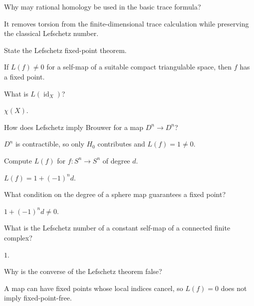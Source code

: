\begin{problem}
Why may rational homology be used in the basic trace formula?
\end{problem}
\begin{solution}
It removes torsion from the finite-dimensional trace calculation while preserving the classical Lefschetz number.
\end{solution}

\begin{problem}
State the Lefschetz fixed-point theorem.
\end{problem}
\begin{solution}
If $L(f)\ne0$ for a self-map of a suitable compact triangulable space, then $f$ has a fixed point.
\end{solution}

\begin{problem}
What is $L(\operatorname{id}_X)$?
\end{problem}
\begin{solution}
$\chi(X)$.
\end{solution}

\begin{problem}
How does Lefschetz imply Brouwer for a map $D^n\to D^n$?
\end{problem}
\begin{solution}
$D^n$ is contractible, so only $H_0$ contributes and $L(f)=1\ne0$.
\end{solution}

\begin{problem}
Compute $L(f)$ for $f:S^n\to S^n$ of degree $d$.
\end{problem}
\begin{solution}
$L(f)=1+(-1)^n d$.
\end{solution}

\begin{problem}
What condition on the degree of a sphere map guarantees a fixed point?
\end{problem}
\begin{solution}
$1+(-1)^n d\ne0$.
\end{solution}

\begin{problem}
What is the Lefschetz number of a constant self-map of a connected finite complex?
\end{problem}
\begin{solution}
$1$.
\end{solution}

\begin{problem}
Why is the converse of the Lefschetz theorem false?
\end{problem}
\begin{solution}
A map can have fixed points whose local indices cancel, so $L(f)=0$ does not imply fixed-point-free.
\end{solution}

